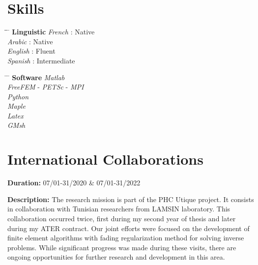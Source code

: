 \documentclass[10pt]{article} %
\begin{document}









\section{Skills}
\parbox{0.5\textwidth}{ %
	\begin{tabbing} %
		\hspace{2.5cm} \= \hspace{1.5cm}\= \hspace{4cm} \= \kill %
		{\bf Linguistic} \> \textit{French} \>:   Native\\ %
		\> 	\textit{Arabic} \>:  Native\\
		\> 	\textit{English} \>:  Fluent\\
		\> 	\textit{Spanish} \>:   Intermediate\\
\end{tabbing}}
\hspace{0.5cm}
\parbox{0.5\textwidth}{ %
	\begin{tabbing} %
		\hspace{3.5cm} \= \hspace{2cm} \= \kill %
		{\bf Software} 	\>  \textit{Matlab}\\
\> \textit{FreeFEM} - \textit{PETSc} - \textit{MPI}\\
\> \textit{Python}\\
\> \textit{Maple}\\
\> 	\textit{Latex}\\
\> 	\textit{GMsh} 
\end{tabbing}}


\section*{International Collaborations}

{
\textbf{Duration:} 07/01-31/2020 \& 07/01-31/2022

\textbf{Description:} The research mission is part of the PHC Utique project. It consists in collaboration with Tunisian researchers from LAMSIN laboratory. This collaboration occurred twice, first during my second year of thesis and later during my ATER contract. Our joint efforts were focused on the development of finite element algorithms with fading regularization method for solving inverse problems. While significant progress was made during these visits, there are ongoing opportunities for further research and development in this area.
}
\end{document}
